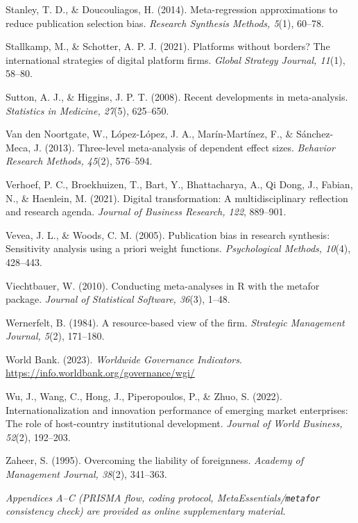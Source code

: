 \documentclass[
  12pt,a4paper]{article}
\begin{document}
Stanley, T. D., \& Doucouliagos, H. (2014). Meta-regression
approximations to reduce publication selection bias. \emph{Research
Synthesis Methods, 5}(1), 60--78.

Stallkamp, M., \& Schotter, A. P. J. (2021). Platforms without borders?
The international strategies of digital platform firms. \emph{Global
Strategy Journal, 11}(1), 58--80.

Sutton, A. J., \& Higgins, J. P. T. (2008). Recent developments in
meta-analysis. \emph{Statistics in Medicine, 27}(5), 625--650.

Van den Noortgate, W., López-López, J. A., Marín-Martínez, F., \&
Sánchez-Meca, J. (2013). Three-level meta-analysis of dependent effect
sizes. \emph{Behavior Research Methods, 45}(2), 576--594.

Verhoef, P. C., Broekhuizen, T., Bart, Y., Bhattacharya, A., Qi Dong,
J., Fabian, N., \& Haenlein, M. (2021). Digital transformation: A
multidisciplinary reflection and research agenda. \emph{Journal of
Business Research, 122}, 889--901.

Vevea, J. L., \& Woods, C. M. (2005). Publication bias in research
synthesis: Sensitivity analysis using a priori weight functions.
\emph{Psychological Methods, 10}(4), 428--443.

Viechtbauer, W. (2010). Conducting meta-analyses in R with the metafor
package. \emph{Journal of Statistical Software, 36}(3), 1--48.

Wernerfelt, B. (1984). A resource-based view of the firm.
\emph{Strategic Management Journal, 5}(2), 171--180.

World Bank. (2023). \emph{Worldwide Governance Indicators}.
\url{https://info.worldbank.org/governance/wgi/}

Wu, J., Wang, C., Hong, J., Piperopoulos, P., \& Zhuo, S. (2022).
Internationalization and innovation performance of emerging market
enterprises: The role of host-country institutional development.
\emph{Journal of World Business, 52}(2), 192--203.

Zaheer, S. (1995). Overcoming the liability of foreignness.
\emph{Academy of Management Journal, 38}(2), 341--363.

\emph{Appendices A--C (PRISMA flow, coding protocol,
MetaEssentials/\texttt{metafor} consistency check) are provided as
online supplementary material.}
\end{document}
